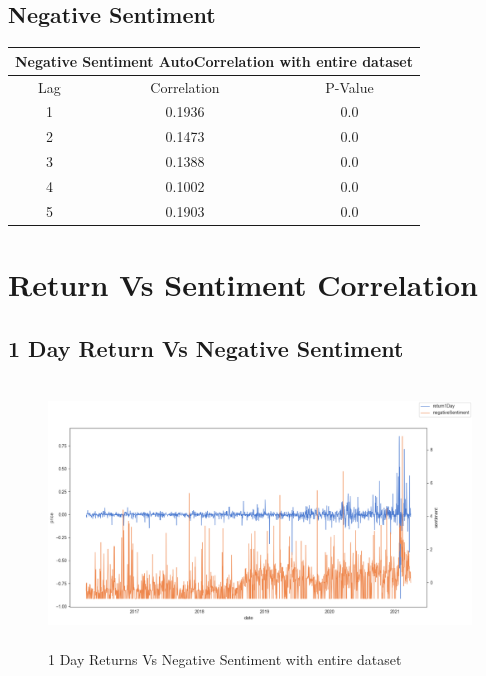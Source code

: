 \subsection{Negative Sentiment}

\begin{center}
\begin{tabular}{ c c c }
\hline
\multicolumn{3}{|c|}{Negative Sentiment AutoCorrelation with entire dataset} \\
\hline
Lag & Correlation & P-Value \\
\hline
1 & 0.1936 & 0.0 \\
2 & 0.1473 & 0.0 \\
3 & 0.1388 & 0.0 \\
4 & 0.1002 & 0.0 \\
5 & 0.1903 & 0.0 \\
\end{tabular}
\end{center}

\section{Return Vs Sentiment Correlation}
\label{appendix:returnSentimentCorrelation}

\subsection{1 Day Return Vs Negative Sentiment}

\begin{figure}[h!]
\centering
\includegraphics[width=15cm,height=7cm,keepaspectratio]{resultsEvaluation/1returnVsNeg.png}
\caption{1 Day Returns Vs Negative Sentiment with entire dataset}
\label{fig:appendix_1returnVsNeg}
\end{figure}

